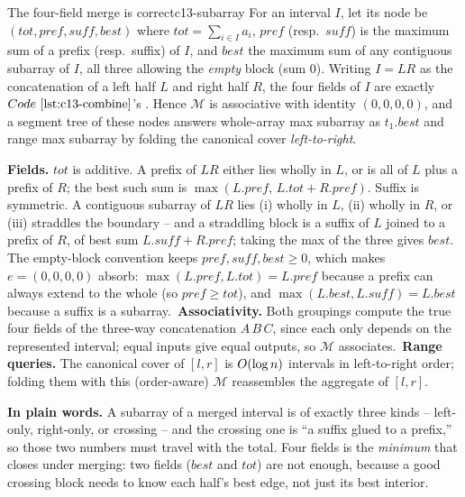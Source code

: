 \begin{theorem}{The four-field merge is correct}{c13-subarray}
For an interval \(I\), let its node be \((\mathit{tot},\mathit{pref},
\mathit{suff},\mathit{best})\) where \(\mathit{tot}=\sum_{i\in I}a_i\),
\(\mathit{pref}\) (resp.\ \(\mathit{suff}\)) is the maximum sum of a prefix
(resp.\ suffix) of \(I\), and \(\mathit{best}\) the maximum sum of any
contiguous subarray of \(I\), all three allowing the \emph{empty} block (sum
\(0\)).  Writing \(I=LR\) as the concatenation of a left half \(L\) and right
half \(R\), the four fields of \(I\) are exactly \(\coderef{c13-combine}\)'s .  Hence \(\mathcal{M}\) is associative with
identity \((0,0,0,0)\), and a segment tree of these nodes answers whole-array
max subarray as \(t_1.\mathit{best}\) and range max subarray by folding the
canonical cover \emph{left-to-right}.
\end{theorem}
\begin{proofbox}
\textbf{Fields.} \(\mathit{tot}\) is additive.  A prefix of \(LR\) either lies
wholly in \(L\), or is all of \(L\) plus a prefix of \(R\); the best such sum is
\(\max(L.\mathit{pref},\,L.\mathit{tot}+R.\mathit{pref})\).  Suffix is symmetric.
A contiguous subarray of \(LR\) lies (i) wholly in \(L\), (ii) wholly in \(R\),
or (iii) straddles the boundary -- and a straddling block is a suffix of \(L\)
joined to a prefix of \(R\), of best sum \(L.\mathit{suff}+R.\mathit{pref}\);
taking the max of the three gives \(\mathit{best}\).  The empty-block convention
keeps \(\mathit{pref},\mathit{suff},\mathit{best}\ge 0\), which makes
\(e=(0,0,0,0)\) absorb: \(\max(L.\mathit{pref},L.\mathit{tot})=L.\mathit{pref}\)
because a prefix can always extend to the whole (so \(\mathit{pref}\ge
\mathit{tot}\)), and \(\max(L.\mathit{best},L.\mathit{suff})=L.\mathit{best}\)
because a suffix is a subarray.\ \textbf{Associativity.} Both groupings compute
the true four fields of the three-way concatenation \(A\,B\,C\), since each only
depends on the represented interval; equal inputs give equal outputs, so
\(\mathcal{M}\) associates.\ \textbf{Range queries.} The canonical cover of
\([l,r]\) is \(O(\log n)\) intervals in left-to-right order; folding them with
this (order-aware) \(\mathcal{M}\) reassembles the aggregate of \([l,r]\).
\end{proofbox}

\noindent\textbf{In plain words.}  A subarray of a merged interval is of exactly
three kinds -- left-only, right-only, or crossing -- and the crossing one is
``a suffix glued to a prefix,'' so those two numbers must travel with the total.
Four fields is the \emph{minimum} that closes under merging: two fields
(\(\mathit{best}\) and \(\mathit{tot}\)) are not enough, because a good crossing
block needs to know each half's best edge, not just its best interior.

